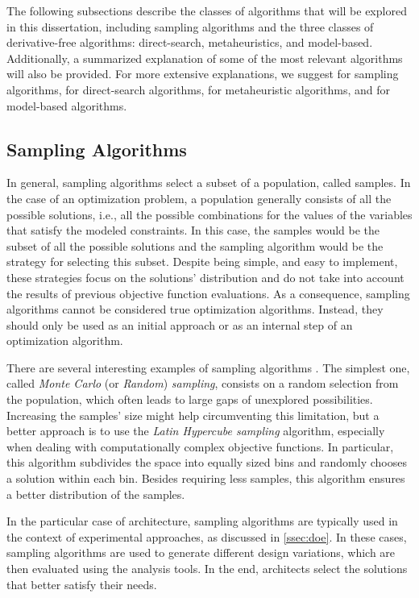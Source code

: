 	The following subsections describe the classes of algorithms that will be explored in this dissertation, including sampling algorithms and the three classes of derivative-free algorithms: direct-search, metaheuristics, and model-based. Additionally, a summarized explanation of some of the most relevant algorithms will also be provided. For more extensive explanations, we suggest \cite{Tille2006} for sampling algorithms, \cite{Conn2009} for direct-search algorithms, \cite{BlumRoli2003Metaheuristics, Glover2003Metaheuristics, Zhou2011} for metaheuristic algorithms, and \cite{Koziel2011} for model-based algorithms.
	
	\subsection{Sampling Algorithms}
	\label{ssec:sampling}
	In general, sampling algorithms select a subset of a population, called samples. In the case of an optimization problem, a population generally consists of all the possible solutions, i.e., all the possible combinations for the values of the variables that satisfy the modeled constraints. In this case, the samples would be the subset of all the possible solutions and the sampling algorithm would be the strategy for selecting this subset. Despite being simple, and easy to implement, these strategies focus on the solutions' distribution and do not take into account the results of previous objective function evaluations. As a consequence, sampling algorithms cannot be considered true optimization algorithms. Instead, they should only be used as an initial approach or as an internal step of an optimization algorithm.
	
	There are several interesting examples of sampling algorithms \cite{Tille2006}. The simplest one, called \textit{Monte Carlo} (or \textit{Random}) \textit{sampling}, consists on a random selection from the population, which often leads to large gaps of unexplored possibilities. Increasing the samples' size might help circumventing this limitation, but a better approach is to use the \textit{Latin Hypercube sampling} algorithm, especially when dealing with computationally complex objective functions. In particular, this algorithm subdivides the space into equally sized bins and randomly chooses a solution within each bin. Besides requiring less samples, this algorithm ensures a better distribution of the samples.
	
	In the particular case of architecture, sampling algorithms are typically used in the context of experimental approaches, as discussed in \cref{ssec:doe}. In these cases, sampling algorithms are used to generate different design variations, which are then evaluated using the analysis tools. In the end, architects select the solutions that better satisfy their needs.
	
